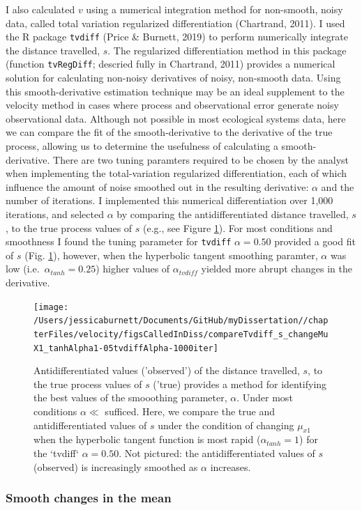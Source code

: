 \documentclass[12pt,twoside,openany]{reedthesis}
\begin{document}
I also calculated \(v\) using a numerical integration method for non-smooth, noisy data, called total variation regularized differentiation (Chartrand, 2011). I used the R package \texttt{tvdiff} (Price \& Burnett, 2019) to perform numerically integrate the distance travelled, \(s\). The regularized differentiation method in this package (function \texttt{tvRegDiff}; descried fully in Chartrand, 2011) provides a numerical solution for calculating non-noisy derivatives of noisy, non-smooth data. Using this smooth-derivative estimation technique may be an ideal supplement to the velocity method in cases where process and observational error generate noisy observational data. Although not possible in most ecological systems data, here we can compare the fit of the smooth-derivative to the derivative of the true process, allowing us to determine the usefulness of calculating a smooth-derivative. There are two tuning paramters required to be chosen by the analyst when implementing the total-variation regularized differentiation, each of which influence the amount of noise smoothed out in the resulting derivative: \(\alpha\) and the number of iterations. I implemented this numerical differentiation over 1,000 iterations, and selected \(\alpha\) by comparing the antidifferentiated distance travelled, \(s\), to the true process values of \(s\) (e.g., see Figure \ref{fig:antiDiffComp}). For most conditions and smoothness I found the tuning parameter for \texttt{tvdiff} \(\alpha=0.50\) provided a good fit of \(s\) (Fig. \ref{fig:antiDiffComp}), however, when the hyperbolic tangent smoothing paramter, \(\alpha\) was low (i.e.~\(\alpha_{tanh}=0.25\)) higher values of \(\alpha_{tvdiff}\) yielded more abrupt changes in the derivative.
\begin{figure}
\texttt{[image: /Users/jessicaburnett/Documents/GitHub/myDissertation//chapterFiles/velocity/figsCalledInDiss/compareTvdiff\_s\_changeMuX1\_tanhAlpha1-05tvdiffAlpha-1000iter]} \caption{Antidifferentiated values ('observed') of the distance travelled, $s$, to the true process values of $s$ ('true) provides a method for identifying the best values of the smooothing parameter, $\alpha$. Under most conditions $\alpha \ll$ sufficed. Here, we compare the true and antidifferentiated values of $s$ under the condition of changing $\mu_{x1}$ when the hyperbolic tangent function is most rapid ($\alpha_{tanh}=1$) for the `tvdiff` $\alpha=0.50$. Not pictured: the antidifferentiated values of $s$ (observed) is increasingly smoothed as $\alpha$ increases.}\label{fig:antiDiffComp}
\end{figure}
\hypertarget{smooth-changes-in-the-mean}{%
\subsubsection{Smooth changes in the mean}\label{smooth-changes-in-the-mean}}
\end{document}
